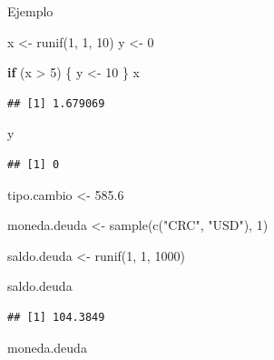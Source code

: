 \documentclass[
  12pt,
]{book}
\newenvironment{Shaded}{\begin{snugshade}}{\end{snugshade}}
\newcommand{\ControlFlowTok}[1]{\textcolor[rgb]{0.13,0.29,0.53}{\textbf{#1}}}
\newcommand{\DecValTok}[1]{\textcolor[rgb]{0.00,0.00,0.81}{#1}}
\newcommand{\FloatTok}[1]{\textcolor[rgb]{0.00,0.00,0.81}{#1}}
\newcommand{\FunctionTok}[1]{\textcolor[rgb]{0.00,0.00,0.00}{#1}}
\newcommand{\NormalTok}[1]{#1}
\newcommand{\OtherTok}[1]{\textcolor[rgb]{0.56,0.35,0.01}{#1}}
\newcommand{\SpecialCharTok}[1]{\textcolor[rgb]{0.00,0.00,0.00}{#1}}
\newcommand{\StringTok}[1]{\textcolor[rgb]{0.31,0.60,0.02}{#1}}
\begin{document}
Ejemplo

\begin{Shaded}
\begin{Highlighting}[]
\NormalTok{x }\OtherTok{\textless{}{-}} \FunctionTok{runif}\NormalTok{(}\DecValTok{1}\NormalTok{, }\DecValTok{1}\NormalTok{, }\DecValTok{10}\NormalTok{)}
\NormalTok{y }\OtherTok{\textless{}{-}} \DecValTok{0}

\ControlFlowTok{if}\NormalTok{ (x }\SpecialCharTok{\textgreater{}} \DecValTok{5}\NormalTok{) \{}
\NormalTok{  y }\OtherTok{\textless{}{-}} \DecValTok{10}
\NormalTok{\}}
\NormalTok{x}
\end{Highlighting}
\end{Shaded}

\begin{verbatim}
## [1] 1.679069
\end{verbatim}

\begin{Shaded}
\begin{Highlighting}[]
\NormalTok{y}
\end{Highlighting}
\end{Shaded}

\begin{verbatim}
## [1] 0
\end{verbatim}

\begin{Shaded}
\begin{Highlighting}[]
\NormalTok{tipo.cambio }\OtherTok{\textless{}{-}} \FloatTok{585.6}

\NormalTok{moneda.deuda }\OtherTok{\textless{}{-}} \FunctionTok{sample}\NormalTok{(}\FunctionTok{c}\NormalTok{(}\StringTok{"CRC"}\NormalTok{, }\StringTok{"USD"}\NormalTok{), }\DecValTok{1}\NormalTok{)}

\NormalTok{saldo.deuda }\OtherTok{\textless{}{-}} \FunctionTok{runif}\NormalTok{(}\DecValTok{1}\NormalTok{, }\DecValTok{1}\NormalTok{, }\DecValTok{1000}\NormalTok{)}

\NormalTok{saldo.deuda}
\end{Highlighting}
\end{Shaded}

\begin{verbatim}
## [1] 104.3849
\end{verbatim}

\begin{Shaded}
\begin{Highlighting}[]
\NormalTok{moneda.deuda}
\end{Highlighting}
\end{Shaded}
\end{document}
